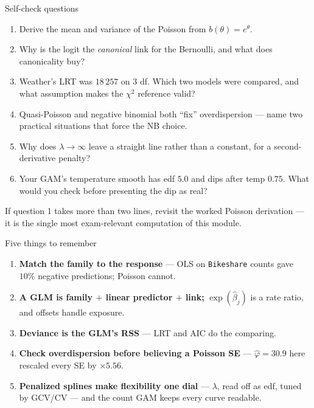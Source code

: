 \documentclass[aspectratio=169,11pt]{beamer}
\begin{document}
\begin{frame}{Self-check questions}
  \footnotesize
  \begin{readme}
    \begin{enumerate}
      \item Derive the mean and variance of the Poisson from $b(\theta) = e^{\theta}$.
      \item Why is the logit the \emph{canonical} link for the Bernoulli, and what
            does canonicality buy?
      \item Weather's LRT was $18\,257$ on $3$ df. Which two models were compared, and
            what assumption makes the $\chi^2$ reference valid?
      \item Quasi-Poisson and negative binomial both ``fix'' overdispersion --- name
            two practical situations that force the NB choice.
      \item Why does $\lambda\to\infty$ leave a straight line rather than a constant,
            for a second-derivative penalty?
      \item Your GAM's temperature smooth has edf $5.0$ and dips after temp $0.75$.
            What would you check before presenting the dip as real?
    \end{enumerate}
  \end{readme}
  \begin{takeaway}
    If question 1 takes more than two lines, revisit the worked Poisson derivation ---
    it is the single most exam-relevant computation of this module.
  \end{takeaway}
\end{frame}

\begin{frame}{Five things to remember}
  \begin{takeaway}
    \begin{enumerate}
      \item \textbf{Match the family to the response} --- OLS on \texttt{Bikeshare} counts
            gave $10\%$ negative predictions; Poisson cannot.
      \item \textbf{A GLM is family $+$ linear predictor $+$ link;} $\exp(\hat\beta_j)$ is
            a rate ratio, and offsets handle exposure.
      \item \textbf{Deviance is the GLM's RSS} --- LRT and AIC do the comparing.
      \item \textbf{Check overdispersion before believing a Poisson SE} ---
            $\hat\varphi = 30.9$ here rescaled every SE by $\times 5.56$.
      \item \textbf{Penalized splines make flexibility one dial} --- $\lambda$, read off
            as edf, tuned by GCV/CV --- and the count GAM keeps every curve readable.
    \end{enumerate}
  \end{takeaway}
\end{frame}
\end{document}
